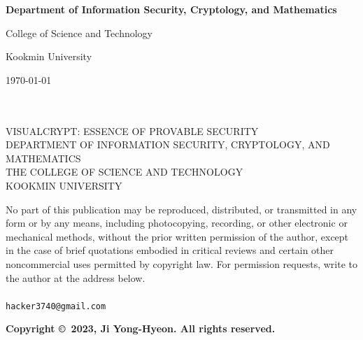 \documentclass[12pt,openany]{book}
\theoremstyle{definition}
\begin{document}
\begin{titlepage}
\begin{center}
%					
			\vspace{1in}\large
			{\bf Department of Information Security, Cryptology, and Mathematics\par}
			{College of Science and Technology\par}
			{Kookmin University\par}
			\vspace{.25in}
			{\large \today\par}
		\end{center}
	\end{titlepage}
	\vfill
	\ \\
	\vspace{15cm}\\
	\noindent VISUALCRYPT: ESSENCE OF PROVABLE SECURITY\\
	DEPARTMENT OF INFORMATION SECURITY, CRYPTOLOGY, AND MATHEMATICS\\
	THE COLLEGE OF SCIENCE AND TECHNOLOGY\\
	KOOKMIN UNIVERSITY
	
	\vspace{10pt} %
	
	\noindent No part of this publication may be reproduced, distributed, or transmitted in any form or by any means, including photocopying, recording, or other electronic or mechanical methods, without the prior written permission of the author, except in the case of brief quotations embodied in critical reviews and certain other noncommercial uses permitted by copyright law. For permission requests, write to the author at the address below.\\
	\\
	\noindent \texttt{hacker3740@gmail.com}
	\\
	\vspace{10pt} %
	
	\noindent \textbf{Copyright \copyright\ 2023, Ji Yong-Hyeon. All rights reserved.}
	
\end{document}
